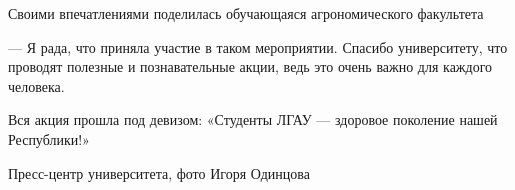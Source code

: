 Своими впечатлениями поделилась обучающаяся агрономического факультета 

\begin{zzquote}
— Я рада, что приняла участие в таком мероприятии. Спасибо университету,
что проводят  полезные и познавательные акции, ведь это очень важно для каждого
человека.	
\end{zzquote}

Вся акция прошла под девизом: «Студенты ЛГАУ — здоровое поколение нашей
Республики!»

Пресс-центр университета, фото Игоря Одинцова
